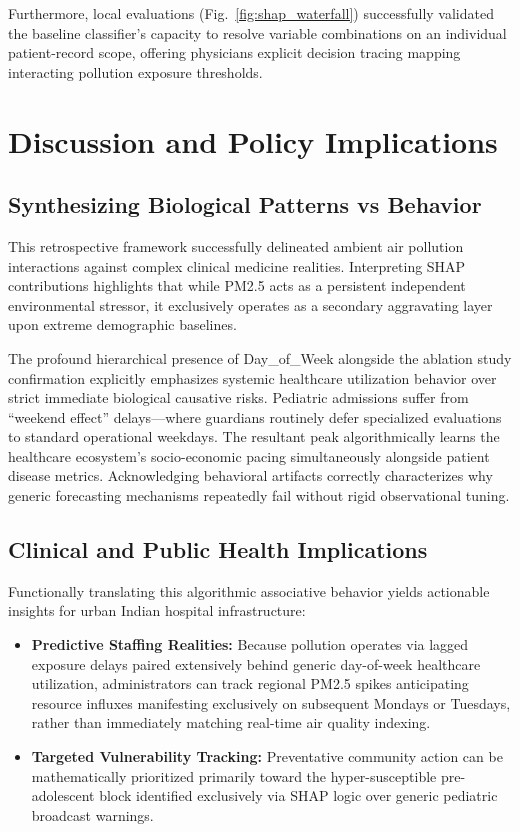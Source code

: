 \documentclass[conference]{IEEEtran}
\begin{document}
Furthermore, local evaluations (Fig.~\ref{fig:shap_waterfall}) successfully validated the baseline classifier's capacity to resolve variable combinations on an individual patient-record scope, offering physicians explicit decision tracing mapping interacting pollution exposure thresholds.

\section{Discussion and Policy Implications}
\subsection{Synthesizing Biological Patterns vs Behavior}
This retrospective framework successfully delineated ambient air pollution interactions against complex clinical medicine realities. Interpreting SHAP contributions highlights that while PM2.5 acts as a persistent independent environmental stressor, it exclusively operates as a secondary aggravating layer upon extreme demographic baselines.

The profound hierarchical presence of Day\_of\_Week alongside the ablation study confirmation explicitly emphasizes systemic healthcare utilization behavior over strict immediate biological causative risks. Pediatric admissions suffer from ``weekend effect'' delays—where guardians routinely defer specialized evaluations to standard operational weekdays. The resultant peak algorithmically learns the healthcare ecosystem's socio-economic pacing simultaneously alongside patient disease metrics. Acknowledging behavioral artifacts correctly characterizes why generic forecasting mechanisms repeatedly fail without rigid observational tuning.

\subsection{Clinical and Public Health Implications}
Functionally translating this algorithmic associative behavior yields actionable insights for urban Indian hospital infrastructure:
\begin{itemize}
    \item \textbf{Predictive Staffing Realities:} Because pollution operates via lagged exposure delays paired extensively behind generic day-of-week healthcare utilization, administrators can track regional PM2.5 spikes anticipating resource influxes manifesting exclusively on subsequent Mondays or Tuesdays, rather than immediately matching real-time air quality indexing.
    \item \textbf{Targeted Vulnerability Tracking:} Preventative community action can be mathematically prioritized primarily toward the hyper-susceptible pre-adolescent block identified exclusively via SHAP logic over generic pediatric broadcast warnings.
\end{itemize}
\end{document}
